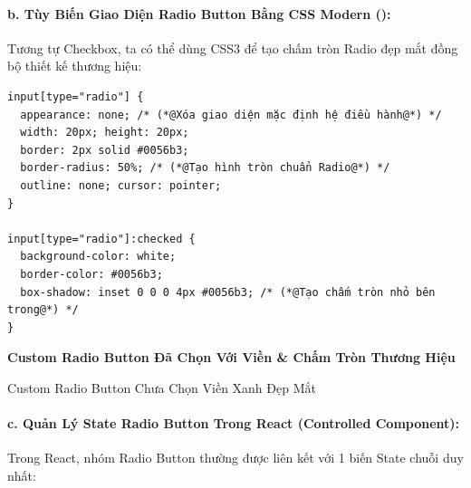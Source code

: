 \paragraph{b. Tùy Biến Giao Diện Radio Button Bằng CSS Modern ():}
Tương tự Checkbox, ta có thể dùng CSS3 để tạo chấm tròn Radio đẹp mắt đồng bộ thiết kế thương hiệu:

\begin{codeWindow}
\begin{lstlisting}[language=HTML5]
input[type="radio"] {
  appearance: none; /* (*@Xóa giao diện mặc định hệ điều hành@*) */
  width: 20px; height: 20px;
  border: 2px solid #0056b3;
  border-radius: 50%; /* (*@Tạo hình tròn chuẩn Radio@*) */
  outline: none; cursor: pointer;
}

input[type="radio"]:checked {
  background-color: white;
  border-color: #0056b3;
  box-shadow: inset 0 0 0 4px #0056b3; /* (*@Tạo chấm tròn nhỏ bên trong@*) */
}
\end{lstlisting}
\end{codeWindow}

\begin{browserWindow}
\sffamily\small
{} \;\textbf{Custom Radio Button Đã Chọn Với Viền \& Chấm Tròn Thương Hiệu} \\[6pt]
 \; Custom Radio Button Chưa Chọn Viền Xanh Đẹp Mắt
\end{browserWindow}

\paragraph{c. Quản Lý State Radio Button Trong React (Controlled Component):}
Trong React, nhóm Radio Button thường được liên kết với 1 biến State chuỗi duy nhất:

